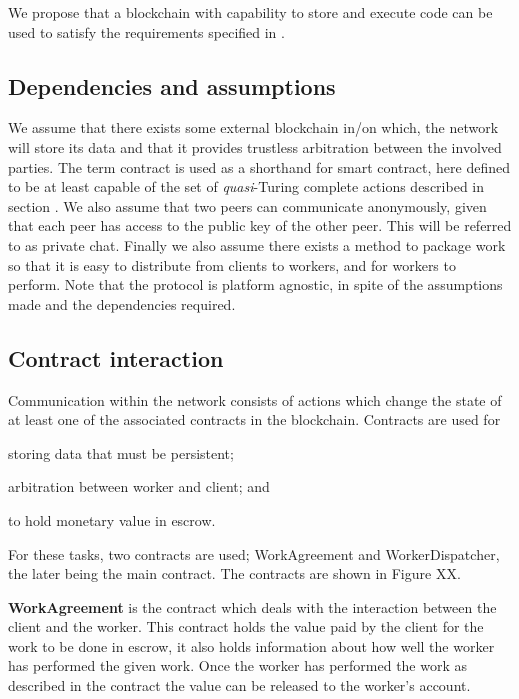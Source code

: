 We propose that a blockchain with capability to store and execute code can be used to satisfy the requirements specified in .

\subsection{Dependencies and assumptions}
\label{sec:res:dependencies}
We assume that there exists some external blockchain in/on which, the network will store its data and that it provides trustless arbitration between the involved parties. The term contract is used as a shorthand for smart contract, here defined to be at least capable of the set of \textit{quasi}-Turing complete actions described in section . We also assume that two peers can communicate anonymously, given that each peer has access to the public key of the other peer. This will be referred to as private chat. Finally we also assume there exists a method to package work so that it is easy to distribute from clients to workers, and for workers to perform.
Note that the protocol is platform agnostic, in spite of the assumptions made and the dependencies required.

\subsection{Contract interaction}
Communication within the network consists of actions which change the state of at least one of the associated contracts in the blockchain. Contracts are used for
\begin{inparaenum}
\item storing data that must be persistent;
\item arbitration between worker and client; and
\item to hold monetary value in escrow.
\end{inparaenum}
For these tasks, two contracts are used; WorkAgreement and WorkerDispatcher, the later being the main contract. The contracts are shown in Figure XX.

\textbf{WorkAgreement} is the contract which deals with the interaction between the client and the worker. This contract holds the value paid by the client for the work to be done in escrow, it also holds information about how well the worker has performed the given work. Once the worker has performed the work as described in the contract the value can be released to the worker's account.

